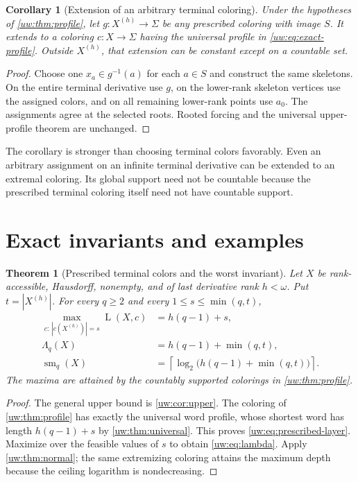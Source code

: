 \documentclass[11pt,letterpaper]{article}
\numberwithin{equation}{section}
\newtheorem{theorem}{Theorem}[section]
\newtheorem{corollary}[corollary]{Corollary}
\theoremstyle{definition}
\theoremstyle{remark}
\theoremstyle{definition}
\newcommand{\ceil}[1]{\left\lceil#1\right\rceil}
\newcommand{\layers}{\operatorname{L}}
\newcommand{\smq}{\operatorname{sm}_{q}}
\begin{document}
\begin{corollary}[Extension of an arbitrary terminal coloring]
\label{uw:cor:prescribed}
Under the hypotheses of \cref{uw:thm:profile}, let
$g:X^{(h)}\to\Sigma$ be any prescribed coloring with image $S$. It extends
to a coloring $c:X\to\Sigma$ having the universal profile in
\eqref{uw:eq:exact-profile}. Outside $X^{(h)}$, that extension can be constant
except on a countable set.
\end{corollary}
\begin{proof}
Choose one $x_a\in g^{-1}(a)$ for each $a\in S$ and construct the same
skeletons. On the entire terminal derivative use $g$, on the lower-rank
skeleton vertices use the assigned colors, and on all remaining lower-rank
points use $a_0$. The assignments agree at the selected roots. Rooted forcing
and the universal upper-profile theorem are unchanged.
\end{proof}

The corollary is stronger than choosing terminal colors favorably. Even an
arbitrary assignment on an infinite terminal derivative can be extended to
an extremal coloring. Its global support need not be countable because the
prescribed terminal coloring itself need not have countable support.

\section{Exact invariants and examples}\label{uw:sec:invariants}

\begin{theorem}[Prescribed terminal colors and the worst invariant]
\label{uw:thm:invariant}
Let $X$ be rank-accessible, Hausdorff, nonempty, and of last derivative rank
$h<\omega$. Put $t=|X^{(h)}|$. For every $q\ge2$ and every
$1\le s\le\min(q,t)$,
\begin{align}
 \max_{c:\,|c(X^{(h)})|=s}\layers(X,c)&=h(q-1)+s,
 \label{uw:eq:prescribed-layer}\\
 \Lambda_q(X)&=h(q-1)+\min(q,t),\label{uw:eq:lambda}\\
 \smq(X)&=\ceil{\log_2\bigl(h(q-1)+\min(q,t)\bigr)}.
 \label{uw:eq:sm}
\end{align}
The maxima are attained by the countably supported colorings in
\cref{uw:thm:profile}.
\end{theorem}
\begin{proof}
The general upper bound is \cref{uw:cor:upper}. The coloring of
\cref{uw:thm:profile} has exactly the universal word profile, whose shortest
word has length $h(q-1)+s$ by \cref{uw:thm:universal}. This proves
\eqref{uw:eq:prescribed-layer}. Maximize over the feasible values of $s$ to
obtain \eqref{uw:eq:lambda}. Apply \cref{uw:thm:normal}; the same extremizing
coloring attains the maximum depth because the ceiling logarithm is
nondecreasing.
\end{proof}
\end{document}
